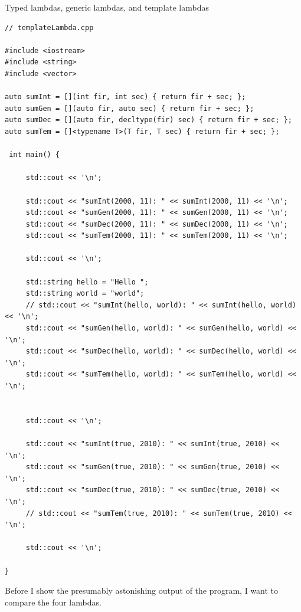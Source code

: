 \noindent
Typed lambdas, generic lambdas, and template lambdas
\begin{lstlisting}[style=styleCXX]
// templateLambda.cpp

#include <iostream>
#include <string>
#include <vector>

auto sumInt = [](int fir, int sec) { return fir + sec; };
auto sumGen = [](auto fir, auto sec) { return fir + sec; };
auto sumDec = [](auto fir, decltype(fir) sec) { return fir + sec; };
auto sumTem = []<typename T>(T fir, T sec) { return fir + sec; };

 int main() {
	
	 std::cout << '\n';
	
	 std::cout << "sumInt(2000, 11): " << sumInt(2000, 11) << '\n';
	 std::cout << "sumGen(2000, 11): " << sumGen(2000, 11) << '\n';
	 std::cout << "sumDec(2000, 11): " << sumDec(2000, 11) << '\n';
	 std::cout << "sumTem(2000, 11): " << sumTem(2000, 11) << '\n';
	
	 std::cout << '\n';
	
	 std::string hello = "Hello ";
	 std::string world = "world";
	 // std::cout << "sumInt(hello, world): " << sumInt(hello, world) << '\n';
	 std::cout << "sumGen(hello, world): " << sumGen(hello, world) << '\n';
	 std::cout << "sumDec(hello, world): " << sumDec(hello, world) << '\n';
	 std::cout << "sumTem(hello, world): " << sumTem(hello, world) << '\n';
	
	
	 std::cout << '\n';
	
	 std::cout << "sumInt(true, 2010): " << sumInt(true, 2010) << '\n';
	 std::cout << "sumGen(true, 2010): " << sumGen(true, 2010) << '\n';
	 std::cout << "sumDec(true, 2010): " << sumDec(true, 2010) << '\n';
	 // std::cout << "sumTem(true, 2010): " << sumTem(true, 2010) << '\n';
	
	 std::cout << '\n';
	
}
\end{lstlisting}

Before I show the presumably astonishing output of the program, I want to compare the four lambdas.

